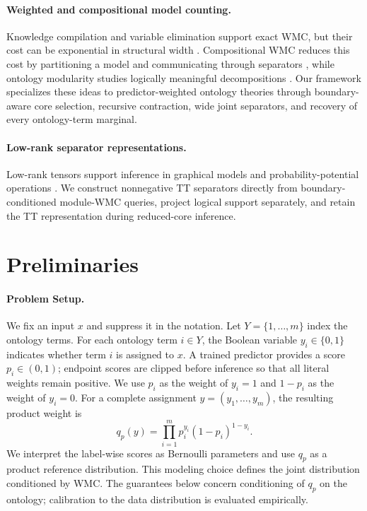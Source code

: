 \documentclass[letterpaper]{article}
\begin{document}
\paragraph{Weighted and compositional model counting.}
Knowledge compilation and variable elimination support exact WMC, but
their cost can be exponential in structural width
\citep{chavira2008wmc,darwiche2002kcmap,darwiche2011sdd,
dudek2020addmc,dudek2020dpmc,bodlaender1993treewidth}. Compositional WMC
reduces this cost by partitioning a model and communicating through
separators \citep{dal2017partitioned,dal2021compositional}, while ontology
modularity studies logically meaningful decompositions
\citep{cuencagrau2008modular,delvescovo2011atomic}. Our framework
specializes these ideas to predictor-weighted ontology theories through
boundary-aware core selection, recursive contraction, wide joint
separators, and recovery of every ontology-term marginal.

\paragraph{Low-rank separator representations.}
Low-rank tensors support inference in graphical models and
probability-potential operations
\citep{oseledets2011tt,oseledets2010ttcross,
novikov2014mrf,wrigley2017tensorbp,ducamp2020lowrank}. We construct
nonnegative TT separators directly from boundary-conditioned module-WMC
queries, project logical support separately, and retain the TT
representation during reduced-core inference.


\section{Preliminaries}
\label{sec:preliminaries}

\paragraph{Problem Setup.}
We fix an input \(x\) and suppress it in the notation. Let
\(Y=\{1,\ldots,m\}\) index the ontology terms. For each ontology term
\(i\in Y\), the Boolean variable \(y_i\in\{0,1\}\) indicates whether
term \(i\) is assigned to \(x\). A trained predictor provides a score
\(p_i\in(0,1)\); endpoint scores are clipped before inference so that all
literal weights remain positive. We use \(p_i\) as the weight of \(y_i=1\)
and \(1-p_i\) as the weight of \(y_i=0\). For a complete assignment
\(y=(y_1,\ldots,y_m)\), the resulting product weight is
\[
q_p(y)
=
\prod_{i=1}^m p_i^{y_i}(1-p_i)^{1-y_i}.
\]
We interpret the label-wise scores as Bernoulli parameters and use
\(q_p\) as a product reference distribution. This modeling choice defines
the joint distribution conditioned by WMC. The guarantees below concern
conditioning of \(q_p\) on the ontology; calibration to the data
distribution is evaluated empirically.
\end{document}
